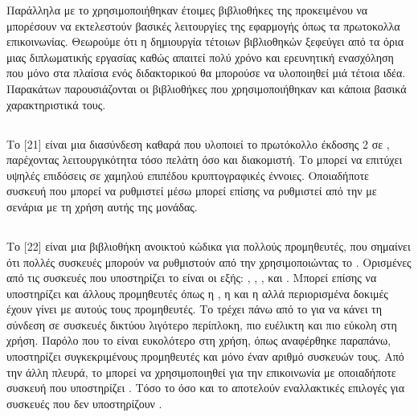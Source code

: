 Παράλληλα με το  χρησιμοποιήθηκαν έτοιμες βιβλιοθήκες της  προκειμένου να μπορέσουν να εκτελεστούν βασικές λειτουργίες της εφαρμογής όπως 
τα πρωτοκολλα επικοινωνίας. Θεωρούμε ότι η δημιουργία τέτοιων βιβλιοθηκών ξεφεύγει από τα όρια μιας διπλωματικής εργασίας καθώς απαιτεί πολύ χρόνο και ερευνητική
ενασχόληση που μόνο στα πλαίσια ενός διδακτορικού θα μπορούσε να υλοποιηθεί μιά τέτοια ιδέα. Παρακάτων παρουσιάζονται οι βιβλιοθήκες που χρησιμοποιήθηκαν και κάποια βασικά χαρακτηριστικά τους.

\subsection{}
Το [21] είναι μια διασύνδεση καθαρά  που υλοποιεί το πρωτόκολλο  έκδοσης 2 σε , παρέχοντας λειτουργικότητα τόσο πελάτη όσο και διακομιστή.
Το  μπορεί να επιτύχει υψηλές επιδόσεις σε χαμηλού επιπέδου κρυπτογραφικές έννοιες.
Οποιαδήποτε συσκευή που μπορεί να ρυθμιστεί μέσω  μπορεί επίσης να ρυθμιστεί από την  με σενάρια με τη χρήση αυτής της μονάδας.

\subsection{}
Το [22] είναι μια βιβλιοθήκη ανοικτού κώδικα για πολλούς προμηθευτές, που σημαίνει ότι πολλές συσκευές μπορούν να ρυθμιστούν από την 
χρησιμοποιώντας το .
Ορισμένες από τις συσκευές που υποστηρίζει το  είναι οι εξής: , , ,  και . 
Μπορεί επίσης να υποστηρίζει και άλλους προμηθευτές όπως η , η  και η  αλλά περιορισμένα 
δοκιμές έχουν γίνει με αυτούς τους προμηθευτές.
Το  τρέχει πάνω από το  για να κάνει τη σύνδεση  σε συσκευές δικτύου λιγότερο περίπλοκη, πιο ευέλικτη και πιο εύκολη στη χρήση. Παρόλο που το  είναι ευκολότερο στη χρήση, όπως αναφέρθηκε 
παραπάνω, υποστηρίζει συγκεκριμένους προμηθευτές και μόνο έναν αριθμό συσκευών τους. Από την άλλη πλευρά,
το  μπορεί να χρησιμοποιηθεί για την επικοινωνία με οποιαδήποτε συσκευή που υποστηρίζει .
Τόσο το όσο και το  αποτελούν εναλλακτικές επιλογές για συσκευές που δεν υποστηρίζουν 
.

